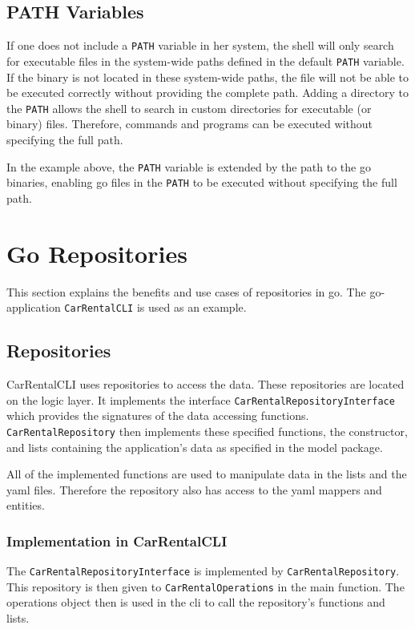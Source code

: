 \subsection{PATH Variables}
If one does not include a \texttt{PATH} variable in her system, the shell will only search for executable files in the system-wide paths defined in the default \texttt{PATH} variable.
If the binary is not located in these system-wide paths, the file will not be able to be executed correctly without providing the complete path.
Adding a directory to the \texttt{PATH} allows the shell to search in custom directories for executable (or binary) files.
Therefore, commands and programs can be executed without specifying the full path.

In the example above, the \texttt{PATH} variable is extended by the path to the go binaries, enabling go files in the \texttt{PATH} to be executed without specifying the full path.

\section{Go Repositories}
\label{sec:go_repositories}
This section explains the benefits and use cases of repositories in go.
The go-application \texttt{CarRentalCLI} is used as an example.

\subsection{Repositories}
CarRentalCLI uses repositories to access the data.
These repositories are located on the logic layer.
It implements the interface \texttt{CarRentalRepositoryInterface} which provides the signatures of the data accessing functions.
\texttt{CarRentalRepository} then implements these specified functions, the constructor, and lists containing the application's data as specified in the model package.

All of the implemented functions are used to manipulate data in the lists and the yaml files.
Therefore the repository also has access to the yaml mappers and entities.

\subsubsection*{Implementation in CarRentalCLI}
The \texttt{CarRentalRepositoryInterface} is implemented by \texttt{CarRentalRepository}.
This repository is then given to \texttt{CarRentalOperations} in the main function.
The operations object then is used in the cli to call the repository's functions and lists.

